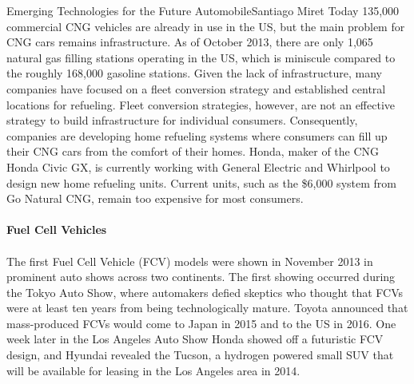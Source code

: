 \documentclass{papertex}
\begin{document}
\begin{news}{2}{Emerging Technologies for the Future Automobile}{Santiago Miret}{}{}
Today 135,000 commercial CNG vehicles are already in use in the US, but the main
problem for CNG cars remains infrastructure. As of October 2013, there are only
1,065 natural gas filling stations operating in the US, which is miniscule
compared to the roughly 168,000 gasoline stations. Given the lack of
infrastructure, many companies have focused on a fleet conversion strategy and
established central locations for refueling. Fleet conversion strategies,
however, are not an effective strategy to build infrastructure for individual
consumers. Consequently, companies are developing home refueling systems where
consumers can fill up their CNG cars from the comfort of their homes. Honda,
maker of the CNG Honda Civic GX, is currently working with General Electric and
Whirlpool to design new home refueling units. Current units, such as the \$6,000
system from Go Natural CNG, remain too expensive for most consumers.
\\
\\
\textbf{Fuel Cell Vehicles}
\\
\\
The first Fuel Cell Vehicle (FCV) models were shown in November 2013 in
prominent auto shows across two continents. The first showing occurred during
the Tokyo Auto Show, where automakers defied skeptics who thought that FCVs were
at least ten years from being technologically mature. Toyota announced that
mass-produced FCVs would come to Japan in 2015 and to the US in 2016. One week
later in the Los Angeles Auto Show Honda showed off a futuristic FCV design, and
Hyundai revealed the Tucson, a hydrogen powered small SUV that will be available
for leasing in the Los Angeles area in 2014.


\end{news}
\end{document}
